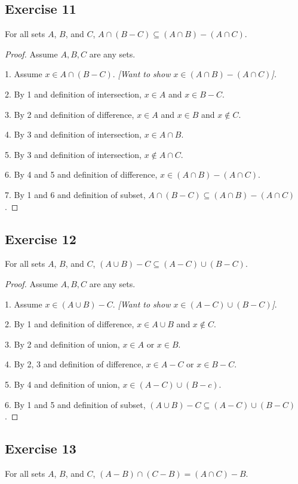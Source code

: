 \documentclass[14pt]{extarticle}
\begin{document}
\subsection{Exercise 11}
For all sets $A$, $B$, and $C$, \(A \cap (B - C) \subseteq (A \cap B) - (A \cap C)\).

\begin{proof}
Assume $A,B,C$ are any sets.

1. Assume \(x \in A \cap (B - C)\). {\it [Want to show \(x \in (A \cap B) - (A \cap C)\)].}

2. By 1 and definition of intersection, $x \in A$ and $x \in B-C$.

3. By 2 and definition of difference, $x \in A$ and $x \in B$ and $x \notin C$.

4. By 3 and definition of intersection, $x \in A \cap B$.

5. By 3 and definition of intersection, $x \notin A \cap C$.

6. By 4 and 5 and definition of difference, \(x \in (A \cap B) - (A \cap C)\).

7. By 1 and 6 and definition of subset, \(A \cap (B - C) \subseteq (A \cap B) - (A \cap C)\).
\end{proof}

\subsection{Exercise 12}
For all sets $A$, $B$, and $C$, \((A \cup B) - C \subseteq (A - C) \cup (B - C)\).

\begin{proof}
Assume $A,B,C$ are any sets.

1. Assume \(x \in (A \cup B) - C\). {\it [Want to show \(x \in (A - C) \cup (B - C)\)]}.

2. By 1 and definition of difference, \(x \in A \cup B\) and \(x \notin C\).

3. By 2 and definition of union, $x \in A$ or $x \in B$.

4. By 2, 3 and definition of difference, $x \in A-C$ or $x \in B-C$.

5. By 4 and definition of union, \(x \in (A-C) \cup (B-c)\).

6. By 1 and 5 and definition of subset, \((A \cup B) - C \subseteq (A - C) \cup (B - C)\).
\end{proof}

\subsection{Exercise 13}
For all sets $A$, $B$, and $C$, \((A - B) \cap (C - B) = (A \cap C) - B\).
\end{document}
